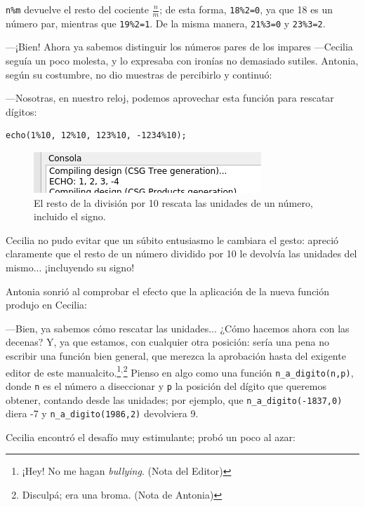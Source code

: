 \guillemotright \lstinline!n%m! devuelve el resto del cociente
$\frac{n}{m}$; de esta forma, \lstinline!18%2=0!, ya que 18 es un
número par, mientras que \lstinline!19%2=1!. De la misma manera,
\lstinline!21%3=0! y \lstinline!23%3=2!.

---¡Bien! Ahora ya sabemos distinguir los números pares de los
impares ---Cecilia seguía un poco molesta, y lo expresaba con ironías no
demasiado sutiles. Antonia, según su costumbre, no dio muestras de
percibirlo y continuó:

---Nosotras, en nuestro reloj, podemos aprovechar esta función para
rescatar dígitos:

\begin{lstlisting}[numbers=none]
echo(1%10, 12%10, 123%10, -1234%10);
\end{lstlisting}

\begin{figure}[ht]
  \centering
\includegraphics[width=.75\textwidth]{imagenes/resto-10}  
\caption{El resto de la división por 10 rescata las unidades de un
  número, incluido el signo.}
  \label{fig:resto-10}
\end{figure}


Cecilia no pudo evitar que un súbito entusiasmo le cambiara el gesto:
apreció claramente que el resto de un número dividido por 10 le
devolvía las unidades del mismo... ¡incluyendo su signo!

Antonia sonrió al comprobar el efecto que la aplicación de la nueva
función produjo en Cecilia:

---Bien, ya sabemos cómo rescatar las unidades... ¿Cómo hacemos ahora
con las decenas? Y, ya que estamos, con cualquier otra posición: sería
una pena no escribir una función bien general, que merezca la
aprobación hasta del exigente editor de este
manualcito.\footnote{¡Hey! No me hagan \emph{bullying}. (Nota del
  Editor)}$^,$\footnote{Disculpá; era una broma. (Nota de Antonia)}
Pienso en algo como una función \lstinline!n_a_digito(n,p)!, donde
\lstinline!n! es el número a diseccionar y \lstinline!p! la posición
del dígito que queremos obtener, contando desde las unidades; por
ejemplo, que \lstinline!n_a_digito(-1837,0)! diera -7 y
\lstinline!n_a_digito(1986,2)! devolviera 9.

Cecilia encontró el desafío muy estimulante; probó un poco al azar:

